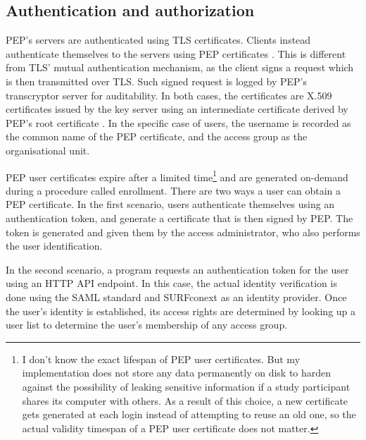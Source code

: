 \documentclass{report}
\begin{document}
\subsection{Authentication and authorization}\label{authentication_and:authorization}
PEP's servers are authenticated using TLS certificates. Clients instead authenticate themselves to the servers using PEP certificates \cite{pep-blueprint}. This is different from
TLS' mutual authentication mechanism, as the client signs a request which is then transmitted over TLS. Such signed request is logged by PEP's transcryptor server for auditability. In
both cases, the certificates are X.509 certificates \cite{X.509} issued by the key server using an intermediate certificate derived by PEP's root certificate \cite{pep-blueprint}.
In the specific case of users, the username is recorded as the common name of the PEP certificate, and the access group as the organisational unit.\par
PEP user certificates expire after a limited time\footnote{I don't know the exact lifespan of PEP user certificates. But my implementation does not store any data permanently on
disk to harden against the possibility of leaking sensitive information if a study participant shares its computer with others. As a result of this choice, a new certificate gets
generated at each login instead of attempting to reuse an old one, so the actual validity timespan of a PEP user certificate does not matter.} and are generated on-demand during a procedure called enrollment. 
There are two ways a user can obtain a PEP certificate. In the first scenario, users authenticate themselves using an authentication token, and generate a certificate that is then
signed by PEP. The token is generated and given them by the access administrator, who also performs the user identification. \par
In the second scenario, a program requests an authentication token for the user using an HTTP API endpoint. In this case, the actual identity verification is done using the SAML 
standard \cite{sstc-saml-core-errata-2.0-wd-07} and SURFconext \cite{surfconext} as an identity provider. Once the user's identity is established, its access rights are determined by 
looking up a user list to determine the user's membership of any access group. 
\end{document}
